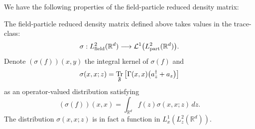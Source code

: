 \documentclass[AHL,Unicode,longabstracts,published]{cedram}
\DeclareMathOperator{\Tr}{Tr}
\DeclareMathOperator{\partt}{part}
\DeclareMathOperator{\field}{field}
\newcommand{\cL}{\mathcal{L}}
\newcommand{\R}{\mathbb{R}}
\newcommand{\gF}{\mathfrak{F}}
\newcommand{\1}{\mathds{1}}
\renewcommand*{\to}{\mathchoice{\longrightarrow}{\rightarrow}{\rightarrow}{\rightarrow}}
\let\originalleft\left
\let\originalright\right
\renewcommand{\left}{\mathopen{}\mathclose\bgroup\originalleft}
\renewcommand{\right}{\aftergroup\egroup\originalright}
\begin{document}
We have the following properties of the field-particle reduced density matrix:

\begin{lemm}\label{lem:redmat}
The field-particle reduced density matrix defined above takes values in the trace-class:
\begin{equation*}
\sigma: L^2_{\field}(\R^d)\to \cL^1 \left(L^2_{\partt}(\R^d)\right).
\end{equation*}
Denote $(\sigma(f))(x,y)$ the integral kernel of $\sigma(f)$ and
\begin{equation*}
\sigma(x,x;z)=\Tr_{\gF}\big[\Gamma(x,x) \left(a^\dagger_z + a_z \right)\big]
\end{equation*}
as an operator-valued distribution satisfying
\begin{equation*}
(\sigma(f))(x,x)=\int_{\R^d}{{f(z)}} \sigma(x,x;z)\,dz.
\end{equation*}
The distribution $\sigma(x,x;z)$ is in fact a function in $L^1_x(L^2_z(\R^d))$.
\end{lemm}
\end{document}
